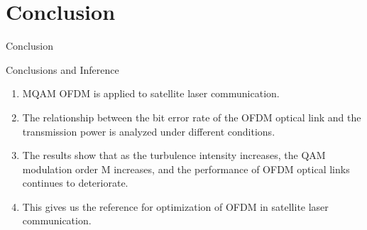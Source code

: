 \documentclass{beamer}
\begin{document}
\section{Conclusion}
\begin{frame}{Conclusion}
    \begin{block}{Conclusions and Inference}
    \begin{enumerate}
        \item MQAM OFDM is applied to satellite laser 
communication.
\item The relationship between the bit error rate 
of the OFDM optical link and the transmission power is 
analyzed under different conditions.
\item The results show that as the turbulence intensity increases, the 
QAM modulation order M increases, and the performance of 
OFDM optical links continues to deteriorate.
\item This gives us the reference for optimization of OFDM in satellite laser communication.
    \end{enumerate}
    \end{block}
\end{frame}
\end{document}
